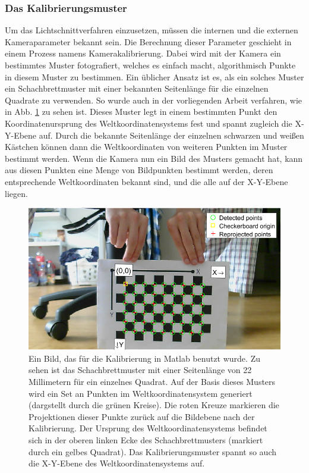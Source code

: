 \subsubsection{Das Kalibrierungsmuster}
Um das Lichtschnittverfahren einzusetzen, müssen die internen und die externen Kameraparameter bekannt sein. Die Berechnung dieser Parameter geschieht in einem Prozess namens Kamerakalibrierung. Dabei wird mit der Kamera ein bestimmtes Muster fotografiert, welches es einfach macht, algorithmisch Punkte in diesem Muster zu bestimmen. Ein üblicher Ansatz ist es, als ein solches Muster ein Schachbrettmuster mit einer bekannten Seitenlänge für die einzelnen Quadrate zu verwenden. So wurde auch in der vorliegenden Arbeit verfahren, wie in Abb. \ref{fig:Calibration} zu sehen ist. Dieses Muster legt in einem bestimmten Punkt den Koordinatenursprung des Weltkoordinatensystems fest und spannt zugleich die X-Y-Ebene auf. Durch die bekannte Seitenlänge der einzelnen schwarzen und weißen Kästchen können dann die Weltkoordinaten von weiteren Punkten im Muster bestimmt werden. Wenn die Kamera nun ein Bild des Musters gemacht hat, kann aus diesen Punkten eine Menge von Bildpunkten bestimmt werden, deren entsprechende Weltkoordinaten bekannt sind, und die alle auf der X-Y-Ebene liegen.

\begin{figure}
\includegraphics[width=\textwidth]{images/Calibration.png}
\caption{Ein Bild, das für die Kalibrierung in Matlab benutzt wurde. Zu sehen ist das Schachbrettmuster mit einer Seitenlänge von 22 Millimetern für ein einzelnes Quadrat. Auf der Basis dieses Musters wird ein Set an Punkten im Weltkoordinatensystem generiert (dargstellt durch die grünen Kreise). Die roten Kreuze markieren die Projektionen dieser Punkte zurück auf die Bildebene nach der Kalibrierung. Der Ursprung des Weltkoordinatensystems befindet sich in der oberen linken Ecke des Schachbrettmusters (markiert durch ein gelbes Quadrat). Das Kalibrierungsmuster spannt so auch die X-Y-Ebene des Weltkoordinatensystems auf. }\label{fig:Calibration}
\end{figure}
 
